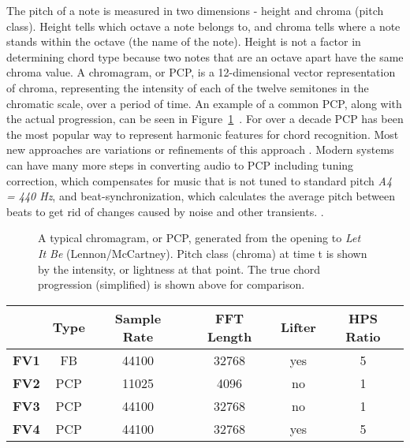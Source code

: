 \documentclass{sig-alternate}
\begin{document}
The pitch of a note is measured in two dimensions - height and chroma (pitch class). Height tells which octave a note belongs to, and chroma tells where a note stands within the octave (the name of the note). Height is not a factor in determining chord type because two notes that are an octave apart have the same chroma value. A chromagram, or PCP, is a 12-dimensional vector representation of chroma, representing the intensity of each of the twelve semitones in the chromatic scale, over a period of time. An example of a common PCP, along with the actual progression, can be seen in Figure~\ref{fig:fig4}~\cite{McVicar:2014}. For over a decade PCP has been the most popular way to represent harmonic features for chord recognition. Most new approaches are variations or refinements of this approach \cite{TaeMin:2014}. Modern systems can have many more steps in converting audio to PCP including tuning correction, which compensates for music that is not tuned to standard pitch \textit{A4 = 440 Hz}, and beat-synchronization, which calculates the average pitch between beats to get rid of changes caused by noise and other transients. \cite{McVicar:2014}.


\begin{figure}
\centering
{}
\caption{A typical chromagram, or PCP, generated from the opening to \textit{Let It Be} (Lennon/McCartney). Pitch class (chroma) at time t is shown by the intensity, or lightness at that point. The true chord progression (simplified) is shown above for comparison.}
\label{fig:fig4}
\end{figure}

\begin{table*}
\centering
\begin{tabular}{|c|c|c|c|c|c|} \hline
 & \textbf{Type} & \textbf{Sample Rate} & \textbf{FFT Length} & \textbf{Lifter} & \textbf{HPS Ratio} \\ \hline
\textbf{FV1} & FB & 44100 & 32768 & yes & 5 \\ \hline
\textbf{FV2} & PCP & 11025 & 4096 & no & 1 \\ \hline
\textbf{FV3} & PCP & 44100 & 32768 & no & 1 \\ \hline
\textbf{FV4} & PCP & 44100 & 32768 & yes & 5 \\ \hline
\end{tabular}
\caption{Feature Vectors used in isolated chord recognition in research case 1~\cite{Morman:2006}.}
\label{tab:tab2}
\end{table*} 
\end{document}
